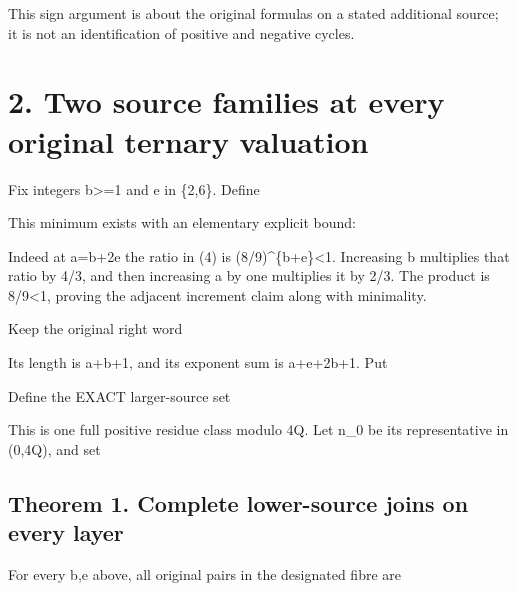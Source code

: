 
This sign argument is about the original formulas on a stated additional
source; it is not an identification of positive and negative cycles.

\section{2. Two source families at every original ternary valuation}

Fix integers b\textgreater=1 and e in \{2,6\}. Define


This minimum exists with an elementary explicit bound:


Indeed at a=b+2e the ratio in (4) is (8/9)\^{}\{b+e\}\textless1.
Increasing b multiplies that ratio by 4/3, and then increasing a by one
multiplies it by 2/3. The product is 8/9\textless1, proving the adjacent
increment claim along with minimality.

Keep the original right word


Its length is a+b+1, and its exponent sum is a+e+2b+1. Put


Define the EXACT larger-source set


This is one full positive residue class modulo 4Q. Let n\_0 be its
representative in (0,4Q), and set


\subsection{Theorem 1. Complete lower-source joins on every layer}

For every b,e above, all original pairs in the designated fibre are


